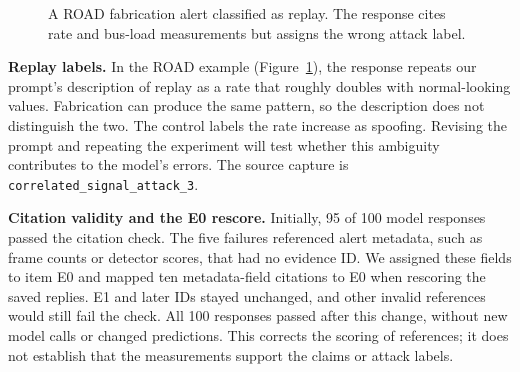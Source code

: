 \documentclass[sigconf]{acmart}
\begin{document}
\begin{figure}[t]
  \small
  \caption{A ROAD fabrication alert classified as replay. The response cites rate and bus-load measurements but assigns the wrong attack label.}
  \label{fig:example}
\end{figure}

\textbf{Replay labels.} In the ROAD example (Figure~\ref{fig:example}), the response repeats our prompt's description of replay as a rate that roughly doubles with normal-looking values. Fabrication can produce the same pattern, so the description does not distinguish the two. The control labels the rate increase as spoofing. Revising the prompt and repeating the experiment will test whether this ambiguity contributes to the model's errors. The source capture is \nolinkurl{correlated_signal_attack_3}.

\textbf{Citation validity and the E0 rescore.} Initially, 95 of 100 model responses passed the citation check. The five failures referenced alert metadata, such as frame counts or detector scores, that had no evidence ID. We assigned these fields to item E0 and mapped ten metadata-field citations to E0 when rescoring the saved replies. E1 and later IDs stayed unchanged, and other invalid references would still fail the check. All 100 responses passed after this change, without new model calls or changed predictions. This corrects the scoring of references; it does not establish that the measurements support the claims or attack labels.
\end{document}
